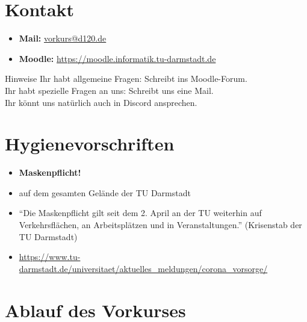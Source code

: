 \section{Kontakt}
\begin{frame}
    \slidehead
    \begin{itemize}
        \item \textbf{Mail:} \href{mailto:vorkurs@d120.de}{vorkurs@d120.de}
        \item \textbf{Moodle:}  \href{https://moodle.informatik.tu-darmstadt.de/course/view.php?id=624} {https://moodle.informatik.tu-darmstadt.de}
    \end{itemize}
    \vspace{2.5cm}
    \begin{alertblock}{Hinweise}
        Ihr habt allgemeine Fragen: Schreibt ins Moodle-Forum. \\
        Ihr habt spezielle Fragen an uns: Schreibt uns eine Mail. \\
        Ihr könnt uns natürlich auch in Discord ansprechen.
    \end{alertblock}
\end{frame}

\section{Hygienevorschriften}
\begin{frame}
    \slidehead
    \begin{itemize}
        \item \textbf{Maskenpflicht!}
        \item auf dem gesamten Gelände der TU Darmstadt
        \item ``Die Maskenpflicht gilt seit dem 2. April an der TU weiterhin auf Verkehrsflächen, an Arbeitsplätzen und in Veranstaltungen.'' (Krisenstab der TU Darmstadt)
        \item \href{https://www.tu-darmstadt.de/universitaet/aktuelles_meldungen/corona_vorsorge/}{https://www.tu-darmstadt.de/universitaet/aktuelles\_meldungen/corona\_vorsorge/}
    \end{itemize}
\end{frame}

\section{Ablauf des Vorkurses}
